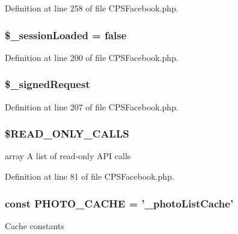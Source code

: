 Definition at line 258 of file CPSFacebook.php.

\hypertarget{classCPSFacebook_aee8e9816087942dab4fb8bd62f413cd6}{
\subsubsection[{\$\_\-sessionLoaded}]{\setlength{\rightskip}{0pt plus 5cm}\$\_\-sessionLoaded = false}}
\label{classCPSFacebook_aee8e9816087942dab4fb8bd62f413cd6}


Definition at line 200 of file CPSFacebook.php.

\hypertarget{classCPSFacebook_a6b432430b58baf6351a7507208363d80}{
\subsubsection[{\$\_\-signedRequest}]{\setlength{\rightskip}{0pt plus 5cm}\$\_\-signedRequest}}
\label{classCPSFacebook_a6b432430b58baf6351a7507208363d80}


Definition at line 207 of file CPSFacebook.php.

\hypertarget{classCPSFacebook_ae5e971be39413de8adc0e47624dbee86}{
\subsubsection[{\$READ\_\-ONLY\_\-CALLS}]{\setlength{\rightskip}{0pt plus 5cm}\$READ\_\-ONLY\_\-CALLS}}
\label{classCPSFacebook_ae5e971be39413de8adc0e47624dbee86}
array A list of read-\/only API calls 

Definition at line 81 of file CPSFacebook.php.

\hypertarget{classCPSFacebook_afba99abd768bc1f4376bbd82d153d50b}{
\subsubsection[{PHOTO\_\-CACHE}]{\setlength{\rightskip}{0pt plus 5cm}const {\bf PHOTO\_\-CACHE} = '\_\-photoListCache'}}
\label{classCPSFacebook_afba99abd768bc1f4376bbd82d153d50b}
Cache constants 

